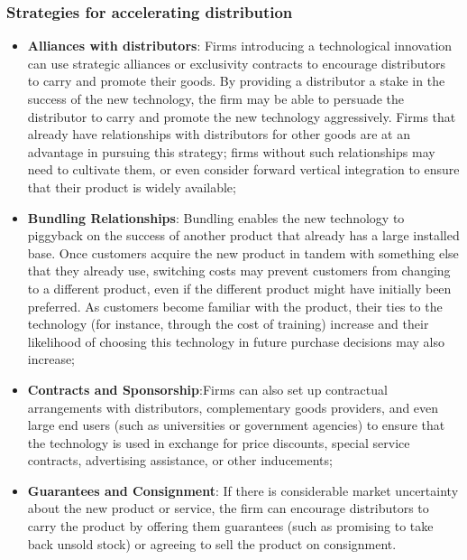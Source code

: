 \documentclass[12pt]{article}
\begin{document}
\subsubsection{Strategies for accelerating distribution}
\begin{itemize}
    \item \textbf{Alliances with distributors}: Firms introducing a technological innovation can use strategic alliances or exclusivity
    contracts to encourage distributors to carry and promote their goods. By providing a
    distributor a stake in the success of the new technology, the firm may be able to persuade
    the distributor to carry and promote the new technology aggressively. Firms that already
    have relationships with distributors for other goods are at an advantage in pursuing this
    strategy; firms without such relationships may need to cultivate them, or even consider
    forward vertical integration to ensure that their product is widely available;
    \item \textbf{Bundling Relationships}: Bundling enables the new technology to piggyback
    on the success of another product that already has a large installed base. Once customers acquire the new product in tandem with something else that they already use,
    switching costs may prevent customers from changing to a different product, even if
    the different product might have initially been preferred. As customers become familiar
    with the product, their ties to the technology (for instance, through the cost of training)
    increase and their likelihood of choosing this technology in future purchase decisions
    may also increase;
    \item \textbf{Contracts and Sponsorship}:Firms can also set up contractual arrangements with distributors, complementary goods
    providers, and even large end users (such as universities or government agencies) to
    ensure that the technology is used in exchange for price discounts, special service contracts, advertising assistance, or other inducements;
    \item \textbf{Guarantees and Consignment}: If there is considerable market uncertainty about the new product or service, the firm
    can encourage distributors to carry the product by offering them guarantees (such as
    promising to take back unsold stock) or agreeing to sell the product on consignment.
\end{itemize}
\end{document}
